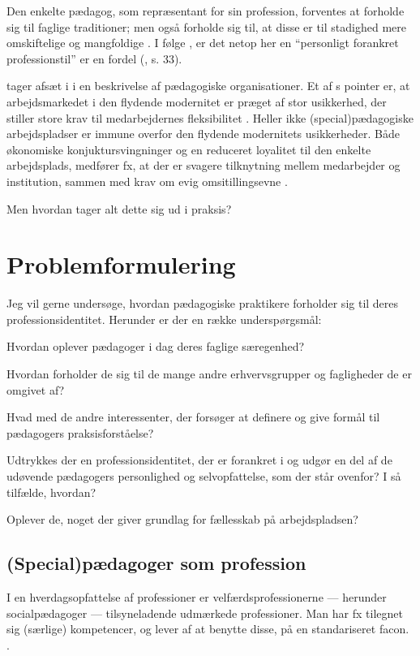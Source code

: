 Den enkelte pædagog, som repræsentant for sin profession, forventes at forholde sig til faglige traditioner; men også forholde sig til, at disse er til stadighed mere omskiftelige og mangfoldige \autocite{hansbolKonstruktionAfProfessionel2008}. I følge \citeauthor{hansbolKonstruktionAfProfessionel2008}, er det netop her en “personligt forankret professionstil” er en fordel (\citeyear{hansbolKonstruktionAfProfessionel2008}, s. 33).

\citeauthor{kofodOrganisationOgLedelse2016} tager afsæt i \citeauthor{baumanLiquidModernity2000} i en beskrivelse af pædagogiske organisationer. 
Et af \citeauthor{baumanLiquidModernity2000}s pointer er, at arbejdsmarkedet i den flydende modernitet er præget af stor usikkerhed, der stiller store krav til medarbejdernes fleksibilitet \autocite[s. ??]{baumanLiquidModernity2000}.
Heller ikke (special)pædagogiske arbejdspladser er immune overfor den flydende modernitets usikkerheder.
Både økonomiske konjuktursvingninger og en reduceret loyalitet til den enkelte arbejdsplads, medfører fx, at der er svagere tilknytning mellem medarbejder og institution, sammen med krav om evig omsitillingsevne \autocite[s. 166f]{kofodOrganisationOgLedelse2016}.

Men hvordan tager alt dette sig ud i praksis?

\section{Problemformulering}
Jeg vil gerne undersøge, hvordan pædagogiske praktikere forholder sig til deres professionsidentitet.
Herunder er der en række underspørgsmål:

Hvordan oplever pædagoger i dag deres faglige særegenhed?

Hvordan forholder de sig til de mange andre erhvervsgrupper og fagligheder de er omgivet af?

Hvad med de andre interessenter, der forsøger at definere og give formål til pædagogers praksisforståelse?

Udtrykkes der en professionsidentitet, der er forankret i og udgør en del af de udøvende pædagogers personlighed og selvopfattelse, som der står ovenfor?
I så tilfælde, hvordan?

Oplever de, noget der giver grundlag for fællesskab på arbejdspladsen?

\subsection{(Special)pædagoger som profession}
I en hverdagsopfattelse af professioner er velfærdsprofessionerne — herunder socialpædagoger — tilsyneladende udmærkede professioner.
Man har fx tilegnet sig (særlige) kompetencer, og lever af at benytte disse, på en standariseret facon. \autocite[ss. 443-445]{frederiksenVelfaerdsprofessionerMellemOmsorg2017}.


